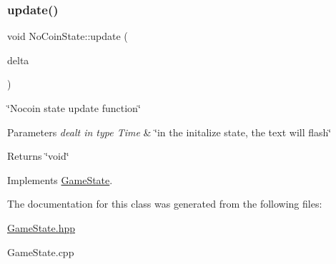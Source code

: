 \subsubsection{\texorpdfstring{update()}{update()}}
{\footnotesize\ttfamily void No\+Coin\+State\+::update (\begin{DoxyParamCaption}\item[{sf\+::\+Time}]{delta }\end{DoxyParamCaption})\hspace{0.3cm}{\ttfamily [virtual]}}



\char`\"{}\+Nocoin state update function\char`\"{} 


\begin{DoxyParams}{Parameters}
{\em dealt in type Time} & \char`\"{}in the initalize state, the text will flash\char`\"{} \\
\hline
\end{DoxyParams}
\begin{DoxyReturn}{Returns}
\char`\"{}void\char`\"{} 
\end{DoxyReturn}


Implements \hyperlink{classGameState_ab1fe4312f7ce88e7dc11f9935dee67d1}{Game\+State}.



The documentation for this class was generated from the following files\+:\begin{DoxyCompactItemize}
\item 
\hyperlink{GameState_8hpp}{Game\+State.\+hpp}\item 
Game\+State.\+cpp\end{DoxyCompactItemize}
